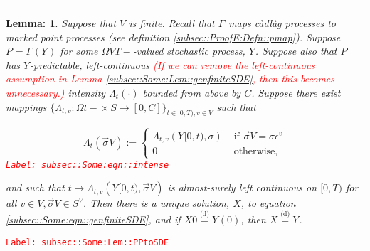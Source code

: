 \documentclass[12pt]{article}
\newcommand{\ra}{\rightarrow}
\newcommand{\te}{\text}
\newcommand{\ep}{\epsilon}
\newcommand{\tr}{\textcolor{red}}
\newcommand{\labe}[1]{\tr{\texttt{Label: #1}}}
\newcommand{\lin}{\rule{\linewidth}{0.4 pt}}
\newcommand{\deq}{\overset{\text{(d)}}{=}}			%
\renewcommand{\v}{v}							%
\renewcommand{\S}{S}							%
\newcommand{\s}{\sigma}							%
\newcommand{\sv}{\vec{\s}}						%
\newcommand{\ev}[1]{\ep^{#1}}					%
\newcommand{\T}{T}								%
\renewcommand{\t}{t}							%
\newcommand{\X}{X}								%
\newcommand{\const}{C}							%
\newcommand{\XState}[1]{\S^{#1}}				%
\newcommand{\rxvtt}[2]{Y_{#1}{(#2)}}				%
\newcommand{\rxvtts}[2]{Y_{#1}{#2}}					%
\newcommand{\rp}[1]{P^{#1}}							%
\newcommand{\ratee}[1]{\Lambda_{#1}}				%
\newcommand{\pmap}[1]{\Gamma_{#1}}				%
\newtheorem{lem}[thms]{Lemma: }
\begin{document}
\lin

\begin{lem}
Suppose that \( V\) is finite. Recall that \(\pmap{}\) maps c\`adl\`ag processes to marked point processes (see definition \ref{subsec::ProofE:Defn::pmap}). Suppose \(\rp{} = \pmap{}(\rxvtts{}{})\) for some \(\Omega{ V}{\T-}\)-valued stochastic process, \(\rxvtts{}{}\). Suppose also that \(\rp{}\) has \(\rxvtts{}{}\)-predictable, left-continuous \tr{(If we can remove the left-continuous assumption in Lemma \ref{subsec::Some:Lem::genfiniteSDE}, then this becomes unnecessary.)} intensity \(\ratee{\t}(\cdot)\) bounded from above by \(\const{}\). Suppose there exist mappings \(\{\ratee{\t,\v}:\Omega{}{\t-}\times \S \ra [0,\const{}]\}_{\t\in[0,\T),\v\in  V}\) such that 

\begin{equation}
\ratee{\t}(\sv{}{ V}) := \begin{cases}
\ratee{\t,\v}(\rxvtts{}{[0,\t)},\s) &\te{ if } \sv{}{ V} = \s\ev{\v}\\
0 &\te{ otherwise,}
\end{cases}
\label{subsec::Some:eqn::intense}
\end{equation}
\labe{subsec::Some:eqn::intense}

and such that \(\t\mapsto \ratee{\t,\v}(\rxvtts{}{[0,\t)},\sv{}{ V})\) is almost-surely left continuous on \([0,\T)\) for all \(\v\in  V,\sv{}{ V}\in \S^ V\). Then there is a unique solution, \(\X{}{}\), to equation \eqref{subsec::Some:eqn::genfiniteSDE}, and if \(\X{}{0} \deq \rxvtt{}{0}\), then \(\X{}{} \deq \rxvtts{}{}\).

\label{subsec::Some:Lem::PPtoSDE}
\end{lem}
\labe{subsec::Some:Lem::PPtoSDE}
\end{document}
